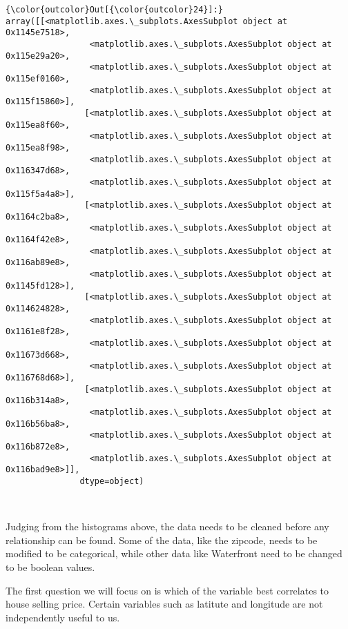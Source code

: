 \documentclass[11pt]{article}
\begin{document}
\begin{Verbatim}[commandchars=\\\{\}]
{\color{outcolor}Out[{\color{outcolor}24}]:} array([[<matplotlib.axes.\_subplots.AxesSubplot object at 0x1145e7518>,
                 <matplotlib.axes.\_subplots.AxesSubplot object at 0x115e29a20>,
                 <matplotlib.axes.\_subplots.AxesSubplot object at 0x115ef0160>,
                 <matplotlib.axes.\_subplots.AxesSubplot object at 0x115f15860>],
                [<matplotlib.axes.\_subplots.AxesSubplot object at 0x115ea8f60>,
                 <matplotlib.axes.\_subplots.AxesSubplot object at 0x115ea8f98>,
                 <matplotlib.axes.\_subplots.AxesSubplot object at 0x116347d68>,
                 <matplotlib.axes.\_subplots.AxesSubplot object at 0x115f5a4a8>],
                [<matplotlib.axes.\_subplots.AxesSubplot object at 0x1164c2ba8>,
                 <matplotlib.axes.\_subplots.AxesSubplot object at 0x1164f42e8>,
                 <matplotlib.axes.\_subplots.AxesSubplot object at 0x116ab89e8>,
                 <matplotlib.axes.\_subplots.AxesSubplot object at 0x1145fd128>],
                [<matplotlib.axes.\_subplots.AxesSubplot object at 0x114624828>,
                 <matplotlib.axes.\_subplots.AxesSubplot object at 0x1161e8f28>,
                 <matplotlib.axes.\_subplots.AxesSubplot object at 0x11673d668>,
                 <matplotlib.axes.\_subplots.AxesSubplot object at 0x116768d68>],
                [<matplotlib.axes.\_subplots.AxesSubplot object at 0x116b314a8>,
                 <matplotlib.axes.\_subplots.AxesSubplot object at 0x116b56ba8>,
                 <matplotlib.axes.\_subplots.AxesSubplot object at 0x116b872e8>,
                 <matplotlib.axes.\_subplots.AxesSubplot object at 0x116bad9e8>]],
               dtype=object)
\end{Verbatim}
            
    \begin{center}
    \end{center}
    { \hspace*{\fill} \\}
    
    Judging from the histograms above, the data needs to be cleaned before
any relationship can be found. Some of the data, like the zipcode, needs
to be modified to be categorical, while other data like Waterfront need
to be changed to be boolean values.

    The first question we will focus on is which of the variable best
correlates to house selling price. Certain variables such as latitute
and longitude are not independently useful to us.
\end{document}
